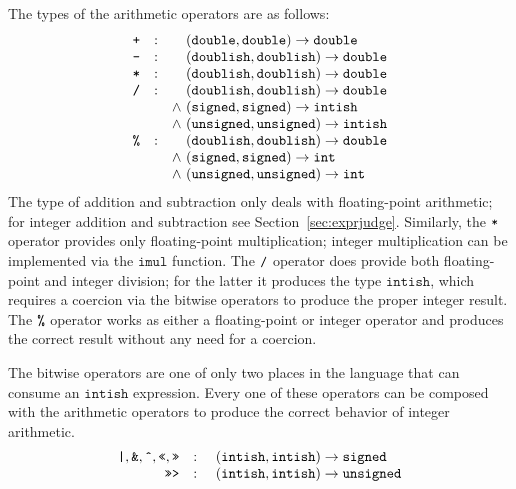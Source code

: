 \documentclass{article}
\newcommand{\funty}[2]{({#1}) \rightarrow {#2}}
\newcommand{\mathjs}[1]{\mbox{\texttt{{#1}}}}
\newcommand{\unsigned}{\mathtt{unsigned}}
\newcommand{\signed}{\mathtt{signed}}
\newcommand{\double}{\mathtt{double}}
\renewcommand{\int}{\mathtt{int}}
\newcommand{\imul}{\mathtt{imul}}
\newcommand{\intish}{\mathtt{intish}}
\newcommand{\doublish}{\mathtt{doublish}}
\begin{document}
The types of the arithmetic operators are as follows:
\[
\begin{array}{rcc@{\ }l}
\mathjs{+}       & : &       & \funty{\double, \double}{\double} \\
\mathjs{-}       & : &       & \funty{\doublish, \doublish}{\double} \\
\mathjs{*}       & : &       & \funty{\doublish, \doublish}{\double} \\
\mathjs{/}       & : &       & \funty{\doublish, \doublish}{\double} \\
                 &   & \land & \funty{\signed, \signed}{\intish}  \\
                 &   & \land & \funty{\unsigned, \unsigned}{\intish} \\
\mathjs{\%}      & : &       & \funty{\doublish, \doublish}{\double} \\
                 &   & \land & \funty{\signed, \signed}{\int}  \\
                 &   & \land & \funty{\unsigned, \unsigned}{\int} \\
\end{array}
\]
The type of addition and subtraction only deals with floating-point
arithmetic; for integer addition and subtraction see
Section~\ref{sec:exprjudge}. Similarly, the $\mathjs{*}$ operator
provides only floating-point multiplication; integer multiplication
can be implemented via the $\imul$ function. The $\mathjs{/}$ operator
does provide both floating-point and integer division; for the latter
it produces the type $\intish$, which requires a coercion via the
bitwise operators to produce the proper integer result. The
$\mathjs{\%}$ operator works as either a floating-point or integer
operator and produces the correct result without any need for a
coercion.

The bitwise operators are one of only two places in the language that
can consume an $\intish$ expression. Every one of these operators can
be composed with the arithmetic operators to produce the correct
behavior of integer arithmetic.
\[
\begin{array}{rcc@{\ }l}
\mathjs{|}, \mathjs{\&}, \mathjs{\^{}}, \mathjs{<<}, \mathjs{>>}
                 & : &       & \funty{\intish, \intish}{\signed} \\
\mathjs{>>>}     & : &       & \funty{\intish, \intish}{\unsigned} \\
\end{array}
\]
\end{document}
